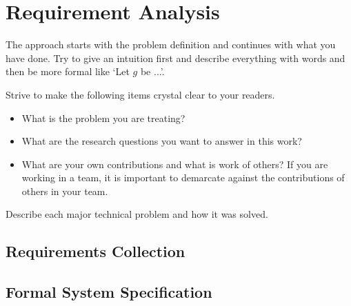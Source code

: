 \chapter{Requirement Analysis}\label{chap:requirement}
The approach starts with the problem definition and continues with what you have done. Try to give an intuition first and describe everything with words and then be more formal like `Let $g$ be ...'.

Strive to make the following items crystal clear to your readers.
\begin{itemize}
\item What is the problem you are treating?
\item What are the research questions you want to answer in this work?
\item What are your own contributions and what is work of others? If
  you are working in a team, it is important to demarcate against the
  contributions of others in your team.
\end{itemize}

Describe each major technical problem and how it was solved.

\section{Requirements Collection}

\section{Formal System Specification}

